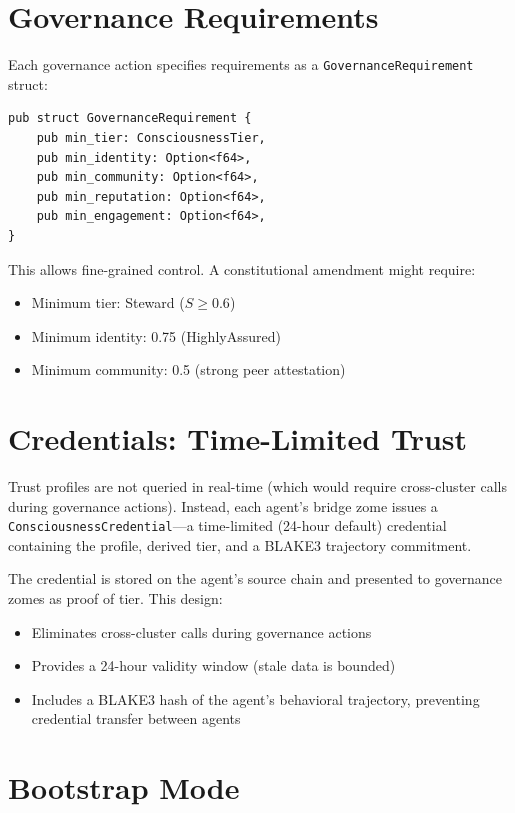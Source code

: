 \documentclass[12pt]{book}
\begin{document}
\section{Governance Requirements}

Each governance action specifies requirements as a \texttt{GovernanceRequirement}
struct:

\begin{lstlisting}
pub struct GovernanceRequirement {
    pub min_tier: ConsciousnessTier,
    pub min_identity: Option<f64>,
    pub min_community: Option<f64>,
    pub min_reputation: Option<f64>,
    pub min_engagement: Option<f64>,
}
\end{lstlisting}

This allows fine-grained control. A constitutional amendment might require:
\begin{itemize}
  \item Minimum tier: Steward ($S \geq 0.6$)
  \item Minimum identity: 0.75 (HighlyAssured)
  \item Minimum community: 0.5 (strong peer attestation)
\end{itemize}

\section{Credentials: Time-Limited Trust}

Trust profiles are not queried in real-time (which would require cross-cluster
calls during governance actions). Instead, each agent's bridge zome issues a
\texttt{ConsciousnessCredential}---a time-limited (24-hour default) credential
containing the profile, derived tier, and a BLAKE3 trajectory commitment.

The credential is stored on the agent's source chain and presented to governance
zomes as proof of tier. This design:

\begin{itemize}
  \item Eliminates cross-cluster calls during governance actions
  \item Provides a 24-hour validity window (stale data is bounded)
  \item Includes a BLAKE3 hash of the agent's behavioral trajectory, preventing
    credential transfer between agents
\end{itemize}

\section{Bootstrap Mode}
\end{document}

